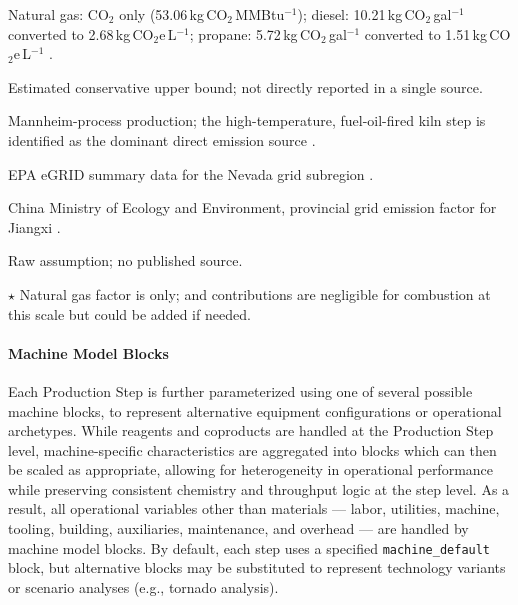 \begin{table}[htbp]
\begin{ThreePartTable}
\begin{tablenotes}[flushleft]
          Natural gas: CO$_2$ only (53.06\,kg\,CO$_2$\,MMBtu$^{-1}$);
          diesel: 10.21\,kg\,CO$_2$\,gal$^{-1}$ converted to
          2.68\,kg\,CO$_2$e\,L$^{-1}$;
          propane: 5.72\,kg\,CO$_2$\,gal$^{-1}$ converted to
          1.51\,kg\,CO$_2$e\,L$^{-1}$ \citep{usepaEmissionFactorsGreenhouse2025}.
    \item[\textit{e}]\hspace{0.05cm} Estimated conservative upper bound; not directly
          reported in a single source.
    \item[\textit{f}]\hspace{0.05cm} Mannheim-process production; the high-temperature,
          fuel-oil-fired kiln step is identified as the dominant direct
          emission source \citep{farahaniAssessingEnergyLoad2024}.
    \item[\textit{g}]\hspace{0.05cm} EPA eGRID summary data for the Nevada grid
          subregion \citep{usepaSummaryData2025}.
    \item[\textit{h}]\hspace{0.05cm} China Ministry of Ecology and Environment,
          provincial grid emission factor for Jiangxi \citep{ministryofecologyandenvironmentGuanYuFaBu2023NianDianLiErYangHuaTanPaiFangYinZiDeGongGaoAnnouncementRelease2025}.
    \item[\textit{i}]\hspace{0.05cm} Raw assumption; no published source.
    \item[$\dagger$] 
          $\star$ Natural gas factor is  only;  and
           contributions are negligible for combustion at this scale but could be added if needed.
  \end{tablenotes}
\end{ThreePartTable}
\end{table}

\paragraph{Machine Model Blocks}\label{app:04-methods-system-blocks}

Each Production Step is further parameterized using one of several possible machine blocks, to represent alternative equipment configurations or operational archetypes. While reagents and coproducts are handled at the Production Step level, machine-specific characteristics are aggregated into blocks which can then be scaled as appropriate, allowing for heterogeneity in operational performance while preserving consistent chemistry and throughput logic at the step level. As a result, all operational variables other than materials --- labor, utilities, machine, tooling, building, auxiliaries, maintenance, and overhead --- are handled by machine model blocks. By default, each step uses a specified \texttt{machine\_default} block, but alternative blocks may be substituted to represent technology variants or scenario analyses (e.g., tornado analysis).

